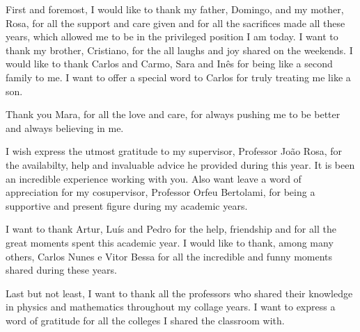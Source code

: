\documentclass[11pt, oneside]{Thesis} %
\begin{document}
\pagestyle{empty}
\setcounter{page}{0}

\cleardoublepage

\pagestyle{fancy}



\frontmatter %

\maketitle

	




\begin{acknowledgements}
	First and foremost, I would like to thank my father, Domingo, and my mother, Rosa, for all the support and care given and for all the sacrifices made all these years, which allowed me to be in the privileged position I am today.
	I want to thank my brother, Cristiano, for the all laughs and joy shared on the weekends.
	I would like to thank Carlos and Carmo, Sara and Inês for being like a second family to me. I want to offer a special word to Carlos for truly treating me like a son.
	
	Thank you Mara, for all the love and care, for always pushing me to be better and always believing in me.

	I wish express the utmost gratitude to my supervisor, Professor João Rosa, for the availabilty, help and invaluable advice he provided during this year. It is been an incredible experience working with you. Also want leave a word of appreciation for my cosupervisor, Professor Orfeu Bertolami, for being a supportive and present figure during my academic years.
	
	I want to thank Artur, Luís and Pedro for the help, friendship and for all the great moments spent this academic year.
	I would like to thank, among many others, Carlos Nunes e Vitor Bessa for all the incredible and funny moments shared during these years.

	Last but not least, I want to thank all the professors who shared their knowledge in physics and mathematics throughout my collage years.
	I want to express a word of gratitude for all the colleges I shared the classroom with.

\end{acknowledgements}
\end{document}
